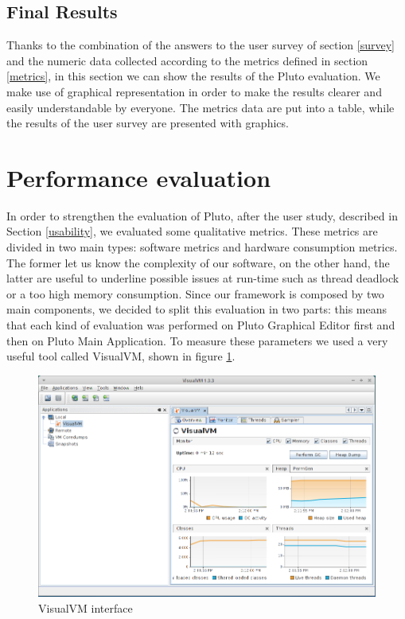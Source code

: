 \subsection{Final Results}\label{surveyResult}

Thanks to the combination of the answers to the user survey of section \ref{survey} and the numeric data collected according to the metrics defined in section \ref{metrics}, in this section we can show the results of the Pluto evaluation.
We make use of graphical representation in order to make the results clearer and easily understandable by everyone.
The metrics data are put into a table, while the results of the user survey are presented with graphics.





\newpage

\section{Performance evaluation}\label{performance}

In order to strengthen the evaluation of Pluto, after the user study, described in Section \ref{usability}, we evaluated some qualitative metrics. These metrics are divided in two main types: software metrics and hardware consumption metrics. The former let us know the complexity of our software, on the other hand, the latter are useful to underline possible issues at run-time such as thread deadlock or a too high memory consumption.
Since our framework is composed by two main components, we decided to split this evaluation in two parts: this means that each kind of evaluation was performed on Pluto Graphical Editor first and then on Pluto Main Application.
To measure these parameters we used a very useful tool called VisualVM, shown in figure \ref{fig:visualVM}. 

\begin{figure}[H]
  \centering
  \includegraphics[width=\linewidth]{pictures/visualVM.png}
  \caption{VisualVM interface}
  \label{fig:visualVM}
\end{figure}

